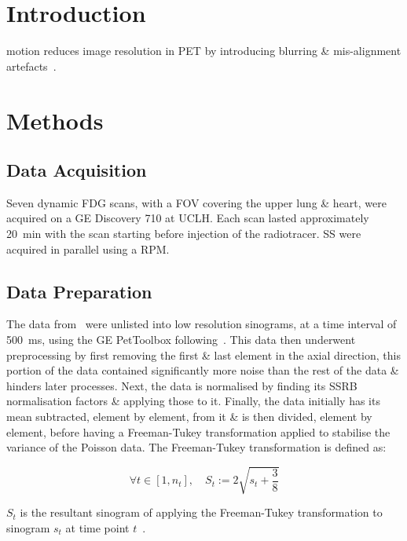 \section{Introduction} \label{sec:introduction}
     motion reduces image resolution in \gls{PET} by introducing blurring \& mis-alignment artefacts~\cite{Nehmeh2008a}. 

\section{Methods} \label{sec:methods}
\subsection{Data Acquisition} \label{sec:data_acquisition}
        Seven dynamic \gls{FDG} scans, with a \gls{FOV} covering the upper lung \& heart, were acquired on a \gls{GE} Discovery 710 at \gls{UCLH}. Each scan lasted approximately \SI{20}{\minute} with the scan starting before injection of the radiotracer. \gls{SS} were acquired in parallel using a \gls{RPM}.
        
    \subsection{Data Preparation} \label{sec:data_preparation}
        The data from~ were unlisted into low resolution sinograms, at a time interval of \SI{500}{\milli\second}, using the \gls{GE} PetToolbox following~\cite{Bertolli2018Data-DrivenTomography}. This data then underwent preprocessing by first removing the first \& last element in the axial direction, this portion of the data contained significantly more noise than the rest of the data \& hinders later processes. Next, the data is normalised by finding its \gls{SSRB} normalisation factors \& applying those to it. Finally, the data initially has its mean subtracted, element by element, from it \& is then divided, element by element, before having a Freeman-Tukey transformation applied to stabilise the variance of the Poisson data. The Freeman-Tukey transformation is defined as:
        
        \begin{equation}
            \forall t \in [1, n_t],\quad S_t := 2 \sqrt{s_t + \frac{3}{8}}
        \end{equation}
        
        \noindent $S_t$ is the resultant sinogram of applying the Freeman-Tukey transformation to sinogram $s_t$ at time point $t$~\cite{Freeman1950TransformationsRoot}.
    
